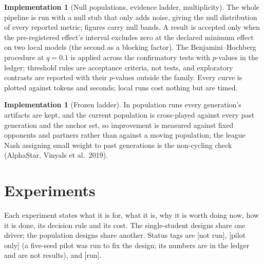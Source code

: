 \documentclass[11pt]{article}
\numberwithin{theorem}{section}
\theoremstyle{definition}
\newtheorem{implementation}[theorem]{Implementation}
\theoremstyle{problemstyle}
\begin{document}
\begin{implementation}[Null populations, evidence ladder, multiplicity]
The whole pipeline is run with a null stub that only adds noise, giving the null distribution of every reported metric;
figures carry null bands. A result is accepted only when the pre-registered effect's interval excludes zero at the
declared minimum effect on two local models (the second as a blocking factor). The Benjamini--Hochberg procedure at
$q=0.1$ is applied across the confirmatory tests with $p$-values in the ledger; threshold rules are acceptance
criteria, not tests, and exploratory contrasts are reported with their $p$-values outside the family. Every curve is
plotted against tokens and seconds; local runs cost nothing but are timed.
\end{implementation}

\begin{implementation}[Frozen ladder]
In population runs every generation's artifacts are kept, and the current population is cross-played against every
past generation and the anchor set, so improvement is measured against fixed opponents and partners rather than
against a moving population; the league Nash assigning small weight to past generations is the non-cycling check
(AlphaStar, Vinyals et al.\ 2019).
\end{implementation}

\section{Experiments}\label{sec:exp}

Each experiment states what it is for, what it is, why it is worth doing now, how it is done, its decision rule and
its cost. The single-student designs share one driver; the population designs share another. Status tags are [not
run], [pilot only] (a five-seed pilot was run to fix the design; its numbers are in the ledger and are not results),
and [run].
\end{document}

